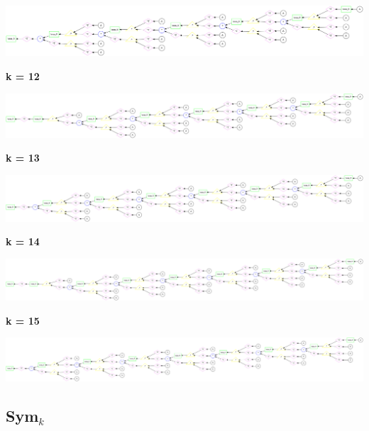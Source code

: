 
\begin{center}
\includegraphics[width=0.45\linewidth]{trees/SumAmultA_11_horizontal_0.png}
\end{center}


{\bf k = 12}


\begin{center}
\includegraphics[width=0.45\linewidth]{trees/SumAmultA_12_horizontal_0.png}
\end{center}


{\bf k = 13}


\begin{center}
\includegraphics[width=0.45\linewidth]{trees/SumAmultA_13_horizontal_0.png}
\end{center}


{\bf k = 14}


\begin{center}
\includegraphics[width=0.45\linewidth]{trees/SumAmultA_14_horizontal_0.png}
\end{center}


{\bf k = 15}


\begin{center}
\includegraphics[width=0.45\linewidth]{trees/SumAmultA_15_horizontal_0.png}
\end{center}


\subsection{{\bf Sym$_k$}}




